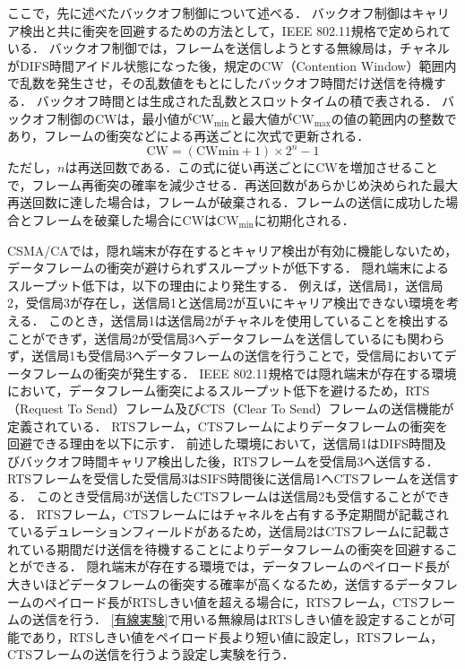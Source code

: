 \documentclass[master]{kuisthesis}		%
\begin{document}
ここで，先に述べたバックオフ制御について述べる．
バックオフ制御はキャリア検出と共に衝突を回避するための方法として，IEEE 802.11規格で定められている．
バックオフ制御では，フレームを送信しようとする無線局は，チャネルがDIFS時間アイドル状態になった後，規定のCW（Contention Window）範囲内で乱数を発生させ，その乱数値をもとにしたバックオフ時間だけ送信を待機する．
バックオフ時間とは生成された乱数とスロットタイムの積で表される．
バックオフ制御のCWは，最小値が$\mathrm{CW_{min}}$と最大値が$\mathrm{CW_{max}}$の値の範囲内の整数であり，フレームの衝突などによる再送ごとに次式で更新される．
\begin{equation}
\mathrm{CW} = (\mathrm{CWmin} + 1) \times 2^{n} - 1
\end{equation}
ただし，$n$は再送回数である．この式に従い再送ごとにCWを増加させることで，フレーム再衝突の確率を減少させる．再送回数があらかじめ決められた最大再送回数に達した場合は，フレームが破棄される．フレームの送信に成功した場合とフレームを破棄した場合にCWは$\mathrm{CW_{min}}$に初期化される．

CSMA/CAでは，隠れ端末が存在するとキャリア検出が有効に機能しないため，データフレームの衝突が避けられずスループットが低下する．
隠れ端末によるスループット低下は，以下の理由により発生する．
例えば，送信局1，送信局2，受信局3が存在し，送信局1と送信局2が互いにキャリア検出できない環境を考える．
このとき，送信局1は送信局2がチャネルを使用していることを検出することができず，送信局2が受信局3へデータフレームを送信しているにも関わらず，送信局1も受信局3へデータフレームの送信を行うことで，受信局においてデータフレームの衝突が発生する．
IEEE 802.11規格では隠れ端末が存在する環境において，データフレーム衝突によるスループット低下を避けるため，RTS（Request To Send）フレーム及びCTS（Clear To Send）フレームの送信機能が定義されている．
RTSフレーム，CTSフレームによりデータフレームの衝突を回避できる理由を以下に示す．
前述した環境において，送信局1はDIFS時間及びバックオフ時間キャリア検出した後，RTSフレームを受信局3へ送信する．
RTSフレームを受信した受信局3はSIFS時間後に送信局1へCTSフレームを送信する．
このとき受信局3が送信したCTSフレームは送信局2も受信することができる．
RTSフレーム，CTSフレームにはチャネルを占有する予定期間が記載されているデュレーションフィールドがあるため，送信局2はCTSフレームに記載されている期間だけ送信を待機することによりデータフレームの衝突を回避することができる．
隠れ端末が存在する環境では，データフレームのペイロード長が大きいほどデータフレームの衝突する確率が高くなるため，送信するデータフレームのペイロード長がRTSしきい値を超える場合に，RTSフレーム，CTSフレームの送信を行う．
\ref{有線実験}で用いる無線局はRTSしきい値を設定することが可能であり，RTSしきい値をペイロード長より短い値に設定し，RTSフレーム，CTSフレームの送信を行うよう設定し実験を行う．
\end{document}
